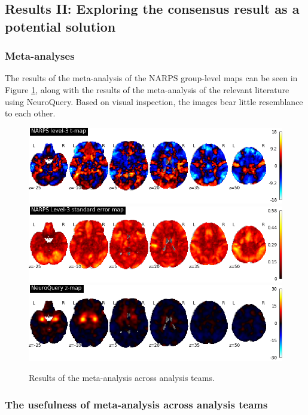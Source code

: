 \documentclass[a4paper,doc,natbib]{apa6}
\begin{document}
\subsection{Results II: Exploring the consensus result as a potential solution}

\subsubsection{Meta-analyses}
The results of the meta-analysis of the NARPS group-level maps can be seen in Figure \ref{fig:meta}, along with the results of the meta-analysis of the relevant literature using NeuroQuery. Based on visual inspection, the images bear little resemblance to each other.


\begin{figure}[!htb]
	\includegraphics[width=\textwidth]
	{figures/results2A_hypo1_NARPS-level-3-t-map.png}
	\includegraphics[width=\textwidth]
	{figures/results2A_hypo1_NARPS-Level-3-standard-error-map.png}
	\includegraphics[width=\textwidth]
	{figures/results2A_hypo1_NeuroQuery-z-map.png}
	\caption{\label{fig:meta} Results of the meta-analysis across analysis teams. }

\end{figure}


\subsubsection{The usefulness of meta-analysis across analysis teams}
\end{document}
